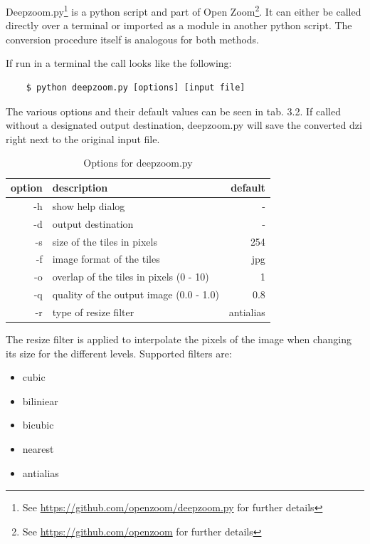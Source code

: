 Deepzoom.py\footnote{See \url{https://github.com/openzoom/deepzoom.py} for further details} is a python script and part of Open Zoom\footnote{See \url{https://github.com/openzoom} for further details}. It can either be called directly over a terminal or imported as a module in another python script. The conversion procedure itself is analogous for both methods.

If run in a terminal the call looks like the following:

\begin{lstlisting}
	$ python deepzoom.py [options] [input file]
\end{lstlisting}

The various options and their default values can be seen in tab. 3.2. If called without a designated output destination, deepzoom.py will save the converted dzi right next to the original input file.

\begin{table}[H]
	\begin{center}
		\begin{tabular}{| r | l | r |}
			\hline
			\textbf{option} & \textbf{description} & \textbf{default} \\ \hline
			-h & show help dialog & - \\ \hline
			-d & output destination & - \\ \hline
			-s & size of the tiles in pixels & 254 \\ \hline
			-f & image format of the tiles & jpg\\ \hline
			-o & overlap of the tiles in pixels (0 - 10) & 1 \\ \hline
			-q & quality of the output image (0.0 - 1.0) & 0.8 \\ \hline
			-r & type of resize filter & antialias \\ \hline
		\end{tabular}
		\caption{Options for deepzoom.py}
	\end{center}
\end{table}

The resize filter is applied to interpolate the pixels of the image when changing its size for the different levels. Supported filters are:

\begin{itemize}
	\item cubic
	\item biliniear
	\item bicubic
	\item nearest
	\item antialias
\end{itemize}

